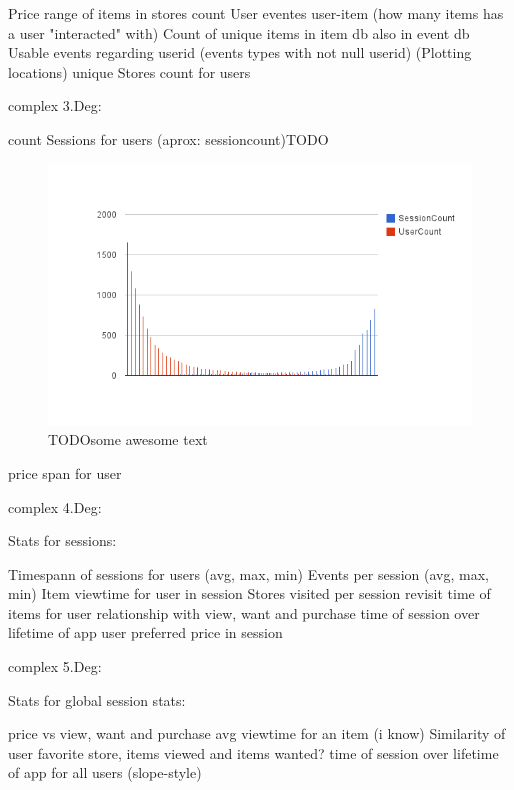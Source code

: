         Price range of items in stores
        count User eventes
        user-item (how many items has a user "interacted" with)
        Count of unique items in item db also in event db
        Usable events regarding userid (events types with not null userid)
        (Plotting locations)
        unique Stores count for users

    complex 3.Deg:

        count Sessions for users (aprox: sessioncount)TODO

\begin{figure}[H]
    \includegraphics[width=5in]{image/global_sessioncount.png}
    \centering
    \caption[Count of sessions per user mapped with count of user with give
    session amount]{TODOsome awesome text}
    \label{figure:ratingdistr}
\end{figure}

        price span for user

    complex 4.Deg:

        Stats for sessions:

            Timespann of sessions for users (avg, max, min)
            Events per session (avg, max, min)
            Item viewtime for user in session
            Stores visited per session
            revisit time of items for user
            relationship with view, want and purchase
            time of session over lifetime of app
            user preferred price in session

    complex 5.Deg:

        Stats for global session stats:

            price vs view, want and purchase
            avg viewtime for an item (i know)
            Similarity of user favorite store, items viewed and items wanted?
            time of session over lifetime of app for all users (slope-style)

